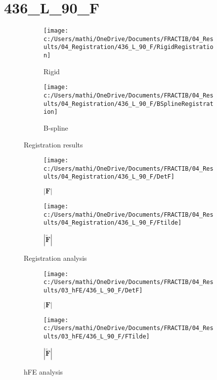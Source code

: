 \documentclass{article}%
\begin{document}
%
\newpage%
\section*{436\_L\_90\_F}%
\label{sec:436L90F}%


\begin{figure}[h!]%
\begin{subfigure}[b]{0.5\linewidth}%
\texttt{[image: c:/Users/mathi/OneDrive/Documents/FRACTIB/04\_Results/04\_Registration/436\_L\_90\_F/RigidRegistration]}%
\caption{Rigid}%
\end{subfigure}%
\begin{subfigure}[b]{0.5\linewidth}%
\texttt{[image: c:/Users/mathi/OneDrive/Documents/FRACTIB/04\_Results/04\_Registration/436\_L\_90\_F/BSplineRegistration]}%
\caption{B{-}spline}%
\end{subfigure}%
\caption{Registration results}%
\end{figure}

%


\begin{figure}[h!]%
\begin{subfigure}[b]{0.5\linewidth}%
\texttt{[image: c:/Users/mathi/OneDrive/Documents/FRACTIB/04\_Results/04\_Registration/436\_L\_90\_F/DetF]}%
\caption{$|\mathbf{F}|$}%
\end{subfigure}%
\begin{subfigure}[b]{0.5\linewidth}%
\texttt{[image: c:/Users/mathi/OneDrive/Documents/FRACTIB/04\_Results/04\_Registration/436\_L\_90\_F/Ftilde]}%
\caption{$|\widetilde{\mathbf{F}}|$}%
\end{subfigure}%
\caption{Registration analysis}%
\end{figure}

%


\begin{figure}[h!]%
\begin{subfigure}[b]{0.5\linewidth}%
\texttt{[image: c:/Users/mathi/OneDrive/Documents/FRACTIB/04\_Results/03\_hFE/436\_L\_90\_F/DetF]}%
\caption{$|\mathbf{F}|$}%
\end{subfigure}%
\begin{subfigure}[b]{0.5\linewidth}%
\texttt{[image: c:/Users/mathi/OneDrive/Documents/FRACTIB/04\_Results/03\_hFE/436\_L\_90\_F/FTilde]}%
\caption{$|\widetilde{\mathbf{F}}|$}%
\end{subfigure}%
\caption{hFE analysis}%
\end{figure}
\end{document}
